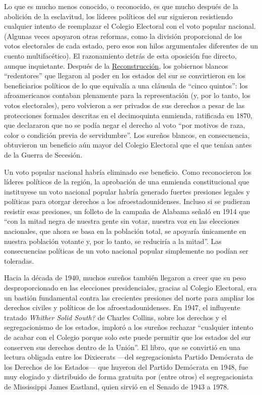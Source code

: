 Lo que es mucho menos conocido, o reconocido, es que mucho después de la
abolición de la esclavitud, los líderes políticos del sur siguieron
resistiendo cualquier intento de reemplazar el Colegio Electoral con el
voto popular nacional. (Algunas veces apoyaron otras reformas, como la
división proporcional de los votos electorales de cada estado, pero esos
son hilos argumentales diferentes de un cuento multifacético). El
razonamiento detrás de esta oposición fue directo, aunque inquietante.
Después de la
\href{https://ar.usembassy.gov/wp-content/uploads/sites/26/2016/10/Capitulo-7_La_guerra_civil_y_la_reconstruccion.pdf}{Reconstrucción},
los gobiernos blancos ``redentores'' que llegaron al poder en los
estados del sur se convirtieron en los beneficiarios políticos de lo que
equivalía a una cláusula de ``cinco quintos'': los afroamericanos
contaban plenamente para la representación (y, por lo tanto, los votos
electorales), pero volvieron a ser privados de sus derechos a pesar de
las protecciones formales descritas en el decimoquinta enmienda,
ratificada en 1870, que declararon que no se podía negar el derecho al
voto ``por motivos de raza, color o condición previa de servidumbre''.
Los sureños blancos, en consecuencia, obtuvieron un beneficio aún mayor
del Colegio Electoral que el que tenían antes de la Guerra de Secesión.

Un voto popular nacional habría eliminado ese beneficio. Como
reconocieron los líderes políticos de la región, la aprobación de una
enmienda constitucional que instituyese un voto nacional popular habría
generado fuertes presiones legales y políticas para otorgar derechos a
los afroestadounidenses. Incluso si se pudieran resistir esas presiones,
un folleto de la campaña de Alabama señaló en 1914 que ``con la mitad
negra de nuestra gente sin votar, nuestra voz en las elecciones
nacionales, que ahora se basa en la población total, se apoyaría
únicamente en nuestra población votante y, por lo tanto, se reduciría a
la mitad''. Las consecuencias políticas de un voto nacional popular
simplemente no podían ser toleradas.

Hacia la década de 1940, muchos sureños también llegaron a creer que su
peso desproporcionado en las elecciones presidenciales, gracias al
Colegio Electoral, era un bastión fundamental contra las crecientes
presiones del norte para ampliar los derechos civiles y políticos de los
afroestadounidenses. En 1947, el influyente tratado \emph{Whither Solid
South?} de Charles Collins, sobre los derechos y el segregacionismo de
los estados, imploró a los sureños rechazar ``cualquier intento de
acabar con el Colegio porque solo este puede permitir que los estados
del sur conserven sus derechos dentro de la Unión''. El libro, que se
convirtió en una lectura obligada entre los Dixiecrats ---del
segregacionista Partido Demócrata de los Derechos de los Estados--- que
huyeron del Partido Demócrata en 1948, fue muy elogiado y distribuido de
forma gratuita por (entre otros) el segregacionista de Mississippi James
Eastland, quien sirvió en el Senado de 1943 a 1978.

